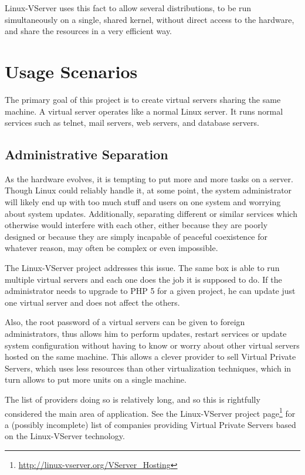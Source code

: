 Linux-VServer uses this fact to allow several distributions, to be run
simultaneously on a single, shared kernel, without direct access to the
hardware, and share the resources in a very efficient way.


\section{Usage Scenarios}

The primary goal of this project is to create virtual servers sharing the same
machine. A virtual server operates like a normal Linux server. It runs normal
services such as telnet, mail servers, web servers, and database servers.


\subsection{Administrative Separation}

As the hardware evolves, it is tempting to put more and more tasks on a server.
Though Linux could reliably handle it, at some point, the system administrator
will likely end up with too much stuff and users on one system and worrying
about system updates. Additionally, separating different or similar services
which otherwise would interfere with each other, either because they are poorly
designed or because they are simply incapable of peaceful coexistence for
whatever reason, may often be complex or even impossible.

The Linux-VServer project addresses this issue. The same box is able to run
multiple virtual servers and each one does the job it is supposed to do. If the
administrator needs to upgrade to PHP 5 for a given project, he can update just
one virtual server and does not affect the others.

Also, the root password of a virtual servers can be given to foreign
administrators, thus allows him to perform updates, restart services or update
system configuration without having to know or worry about other virtual
servers hosted on the same machine. This allows a clever provider to sell
Virtual Private Servers, which uses less resources than other virtualization
techniques, which in turn allows to put more units on a single machine.

The list of providers doing so is relatively long, and so this is rightfully
considered the main area of application. See the Linux-VServer project
page\footnote{\url{http://linux-vserver.org/VServer_Hosting}} for a (possibly
incomplete) list of companies providing Virtual Private Servers based on the
Linux-VServer technology.


